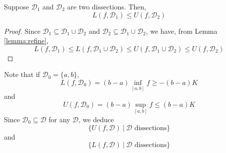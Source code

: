 \documentclass[10pt, a4paper, twoside]{report}
\begin{document}
\begin{lemma}
    Suppose \(\mathcal{D}_1\) and \(\mathcal{D}_2\) are two dissections. Then,
    \[L(f,\mathcal{D}_1)\leq U(f,\mathcal{D}_2)\]
    \label{lemma:ulsum_rel}
\end{lemma}
\begin{proof}
    Since \(\mathcal{D}_1\subseteq\mathcal{D}_1\cup\mathcal{D}_2\) and  \(\mathcal{D}_2\subseteq\mathcal{D}_1\cup\mathcal{D}_2\), we have, from Lemma \ref{lemma:refine}, 
    \[L(f,\mathcal{D}_1)\leq L(f,\mathcal{D}_1\cup\mathcal{D}_2)\leq U(f,\mathcal{D}_1\cup\mathcal{D}_2)\leq U(f,\mathcal{D}_2)\]
\end{proof}
Note that if \(\mathcal{D}_0=\{a,b\}\),
\[L(f,\mathcal{D}_0)=(b-a)\inf_{[a,b]}f\geq-(b-a)K\]
and 
\[U(f,\mathcal{D}_0)=(b-a)\sup_{[a,b]}f\leq(b-a)K\]
Since \(\mathcal{D}_0\subseteq\mathcal{D}\) for any \(\mathcal{D}\), we deduce 
\[\{U(f,\mathcal{D})\:|\:\mathcal{D}\text{  dissections}\}\]
and 
\[\{L(f,\mathcal{D})\:|\:\mathcal{D}\text{  dissections}\}\]
\end{document}
